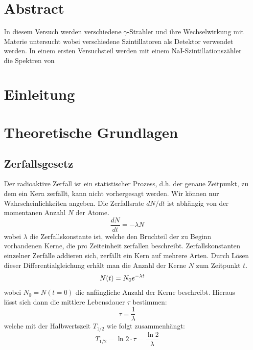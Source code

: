 \documentclass[12pt,listof=totoc]{scrartcl}
\title{\vspace{0cm}{\Huge Fortgeschrittenen-Praktikum I:\\ \vspace{1cm} Szintillationszähler}}
\author{Saskia Bondza\\Simon Stephan}
\date{durchgeführt am 12.10.2016 und 13.10.2016}
\begin{document}
\maketitle
\newpage

\section*{Abstract}

In diesem Versuch werden verschiedene $\gamma$-Strahler und ihre Wechselwirkung mit Materie untersucht wobei verschiedene Szintillatoren als Detektor verwendet werden. 
In einem ersten Versuchsteil werden mit einem NaI-Szintillationszähler die Spektren von


\newpage

\thispagestyle{empty}
\tableofcontents
\newpage

\section{Einleitung}




\newpage
\section{Theoretische Grundlagen}

\subsection{Zerfallsgesetz}\label{zerfallsgesetz}
Der radioaktive Zerfall ist ein statistischer Prozess, d.h. der genaue Zeitpunkt, zu dem ein Kern zerfällt, kann nicht vorhergesagt werden. Wir können nur Wahrscheinlichkeiten angeben. Die Zerfallsrate $dN/dt$ ist abhängig von der momentanen Anzahl $N$ der Atome.
\[\frac{dN}{dt}=-\lambda N\]
wobei $\lambda$ die Zerfallskonstante ist, welche den Bruchteil der zu Beginn vorhandenen Kerne, die pro Zeiteinheit zerfallen beschreibt. Zerfallskonstanten einzelner Zerfälle addieren sich, zerfällt ein Kern auf mehrere Arten. Durch Lösen dieser Differentialgleichung erhält man die Anzahl der Kerne $N$ zum Zeitpunkt $t$.
\[N(t)=N_0e^{-\lambda t}\hspace{0.5cm}\]
wobei $N_0=N(t=0)$ die anfängliche Anzahl der Kerne beschreibt. Hieraus lässt sich dann die mittlere Lebensdauer $\tau$ bestimmen:
\[\tau=\frac{1}{\lambda}\]
welche mit der Halbwertszeit $T_{1/2}$ wie folgt zusammenhängt:
\[T_{1/2} = \ln2\cdot \tau = \frac{\ln2}{\lambda}\]
\end{document}
